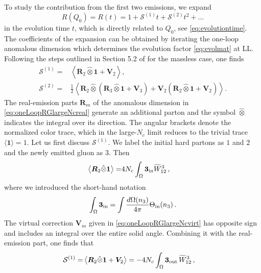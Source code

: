 \documentclass[11pt,a4paper]{article}
\begin{document}
 To study the contribution from the first two emissions, we expand
\begin{equation}\label{eq:fixedorderexpansion}
R\left(Q_0\right) = R(t) = 1 + \mathcal{S}^{(1)} t + \mathcal{S}^{(2)} t^2 + \dots
\end{equation}
in the evolution time $t$, which is directly related to $Q_0$, see \eqref{eq:evolutiontime}. The coefficients of the expansion can be obtained by iterating the one-loop anomalous dimension which determines the evolution factor \eqref{eq:evolmat} at LL.  Following the steps outlined in Section 5.2 of \cite{Becher:2016mmh} for the massless case, one finds
\begin{align}
\mathcal{S}^{(1)} =& \left \langle {\bm R}_2 \hat{\otimes} \bm{1} + {\bm V}_2 \right \rangle , \nonumber \\
\mathcal{S}^{(2)} =& \frac{1}{2} \left\langle {\bm R}_2  \hat{\otimes}  \left({\bm R}_3  \hat{\otimes}  \bm{1} +{\bm V}_3  \right)  + {\bm V}_2 \left( {\bm R}_2 \hat{\otimes} \bm{1} + {\bm V}_2\right)\right \rangle .
\label{eq:SRV} 
 \end{align}
 The real-emission parts ${\bm R}_m$ of the anomalous dimension in \eqref{eq:oneLoopRGlargeNcreal} generate an additional parton and the symbol $\hat{\otimes}$ indicates the integral over its direction. The angular brackets denote the normalized color trace, which in the large-$N_c$ limit reduces to the trivial trace $\langle \bm{1} \rangle = 1$. Let us first discuss $\mathcal{S}^{(1)}$. We label the initial hard partons as $1$ and $2$ and the newly emitted gluon as $3$. Then 
 \begin{align}
 \left \langle {\bm R}_2 \hat{\otimes} \bm{1}  \right  \rangle=& 4 N_c \int_\Omega  {\bm 3}_{\rm in}  \widetilde{W}_{12}^3\,,
 \end{align}
 where we introduced the short-hand notation
 \begin{align}\label{eq:fixedordercoeffNLO}
\int_\Omega {\bm 3}_{\rm in} = \int \frac{d \Omega (n_3)}{4 \pi} \Theta_{\rm in} (n_3)\,.
 \end{align}
 The virtual correction ${\bm V}_m$ given in \eqref{eq:oneLoopRGlargeNcvirt} has opposite sign and includes an integral over the entire solid angle. Combining it with the real-emission part, one finds that
 \begin{align}
\mathcal{S}^{(1)} =& \left \langle {\bm R}_2 \hat{\otimes} \bm{1} + {\bm V}_2 \right \rangle = - 4 N_c \int_\Omega  {\bm 3}_{\rm out} \, \widetilde{W}_{12}^3  \, , 
\label{eq:Sone} 
 \end{align}
\end{document}
